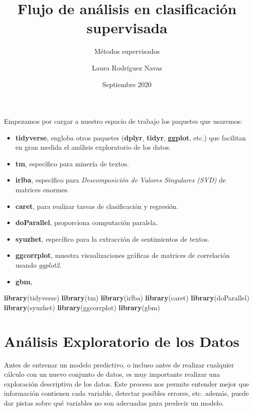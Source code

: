 \documentclass[
]{article}
\title{Flujo de análisis en clasificación supervisada}
\subtitle{Métodos supervisados}
\author{Laura Rodríguez Navas}
\date{Septiembre 2020}
\newenvironment{Shaded}{\begin{snugshade}}{\end{snugshade}}
\newcommand{\KeywordTok}[1]{\textcolor[rgb]{0.13,0.29,0.53}{\textbf{#1}}}
\newcommand{\NormalTok}[1]{#1}
\providecommand{\tightlist}{%
  \setlength{\itemsep}{0pt}\setlength{\parskip}{0pt}}
\begin{document}
\maketitle

{
\setcounter{tocdepth}{2}
\tableofcontents
}
Empezamos por cargar a nuestro espacio de trabajo los paquetes que
usaremos:

\begin{itemize}
\tightlist
\item
  \textbf{tidyverse}, engloba otros paquetes (\textbf{dplyr},
  \textbf{tidyr}, \textbf{ggplot}, etc.) que facilitan en gran medida el
  análisis exploratorio de los datos.
\item
  \textbf{tm}, específico para minería de textos.
\item
  \textbf{irlba}, específico para \emph{Descomposición de Valores
  Singulares (SVD)} de matrices enormes.
\item
  \textbf{caret}, para realizar tareas de clasificación y regresión.
\item
  \textbf{doParallel}, proporciona computación paralela.
\item
  \textbf{syuzhet}, específico para la extracción de sentimientos de
  textos.
\item
  \textbf{ggcorrplot}, muestra visualizaciones gráficas de matrices de
  correlación usando \emph{ggplot2}.
\item
  \textbf{gbm},
\end{itemize}

\begin{Shaded}
\begin{Highlighting}[]
\KeywordTok{library}\NormalTok{(tidyverse)}
\KeywordTok{library}\NormalTok{(tm)}
\KeywordTok{library}\NormalTok{(irlba)}
\KeywordTok{library}\NormalTok{(caret)}
\KeywordTok{library}\NormalTok{(doParallel)}
\KeywordTok{library}\NormalTok{(syuzhet)}
\KeywordTok{library}\NormalTok{(ggcorrplot)}
\KeywordTok{library}\NormalTok{(gbm)}
\end{Highlighting}
\end{Shaded}

\hypertarget{anuxe1lisis-exploratorio-de-los-datos}{%
\section{Análisis Exploratorio de los
Datos}\label{anuxe1lisis-exploratorio-de-los-datos}}

Antes de entrenar un modelo predictivo, o incluso antes de realizar
cualquier cálculo con un nuevo conjunto de datos, es muy importante
realizar una exploración descriptiva de los datos. Este proceso nos
permite entender mejor que información contienen cada variable, detectar
posibles errores, etc. además, puede dar pistas sobre qué variables no
son adecuadas para predecir un modelo.
\end{document}
